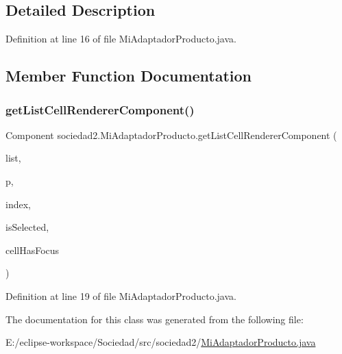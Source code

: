 \subsection{Detailed Description}


Definition at line 16 of file Mi\+Adaptador\+Producto.\+java.



\subsection{Member Function Documentation}
\mbox{\label{classsociedad2_1_1_mi_adaptador_producto_af202727879511339e4a8916d8e7f3be5}} 
\subsubsection{\texorpdfstring{get\+List\+Cell\+Renderer\+Component()}{getListCellRendererComponent()}}
{\footnotesize\ttfamily Component sociedad2.\+Mi\+Adaptador\+Producto.\+get\+List\+Cell\+Renderer\+Component (\begin{DoxyParamCaption}\item[{J\+List$<$? extends \mbox{\hyperlink{classsociedad2_1_1_producto}{Producto}} $>$}]{list,  }\item[{\mbox{\hyperlink{classsociedad2_1_1_producto}{Producto}}}]{p,  }\item[{int}]{index,  }\item[{boolean}]{is\+Selected,  }\item[{boolean}]{cell\+Has\+Focus }\end{DoxyParamCaption})}



Definition at line 19 of file Mi\+Adaptador\+Producto.\+java.



The documentation for this class was generated from the following file\+:\begin{DoxyCompactItemize}
\item 
E\+:/eclipse-\/workspace/\+Sociedad/src/sociedad2/\mbox{\hyperlink{_mi_adaptador_producto_8java}{Mi\+Adaptador\+Producto.\+java}}\end{DoxyCompactItemize}
